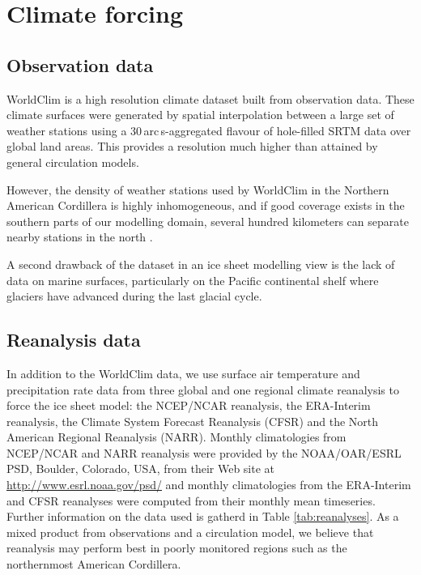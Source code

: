 
\section{Climate forcing}
\label{sec:climate}


\subsection{Observation data}

WorldClim \citep{data:worldclim} is a high resolution climate dataset built from observation data. These climate surfaces were generated by spatial interpolation between a large set of weather stations using a 30\,arc\,s-aggregated flavour of hole-filled SRTM data over global land areas. This provides a resolution much higher than attained by general circulation models.

However, the density of weather stations used by WorldClim in the Northern American Cordillera is highly inhomogeneous, and if good coverage exists in the southern parts of our modelling domain, several hundred kilometers can separate nearby stations in the north \citep{data:worldclim}.

A second drawback of the dataset in an ice sheet modelling view is the lack of data on marine surfaces, particularly on the Pacific continental shelf where glaciers have advanced during the last glacial cycle\needref.


\subsection{Reanalysis data}

In addition to the WorldClim data, we use surface air temperature and precipitation rate data from three global and one regional climate reanalysis to force the ice sheet model: the NCEP/NCAR reanalysis, the ERA-Interim reanalysis, the Climate System Forecast Reanalysis (CFSR) and the North American Regional Reanalysis (NARR). Monthly climatologies from NCEP/NCAR and NARR reanalysis were provided by the NOAA/OAR/ESRL PSD, Boulder, Colorado, USA, from their Web site at \url{http://www.esrl.noaa.gov/psd/} and monthly climatologies from the ERA-Interim and CFSR reanalyses were computed from their monthly mean timeseries. Further information on the data used is gatherd in Table \ref{tab:reanalyses}. As a mixed product from observations and a circulation model, we believe that reanalysis may perform best in poorly monitored regions such as the northernmost American Cordillera.

